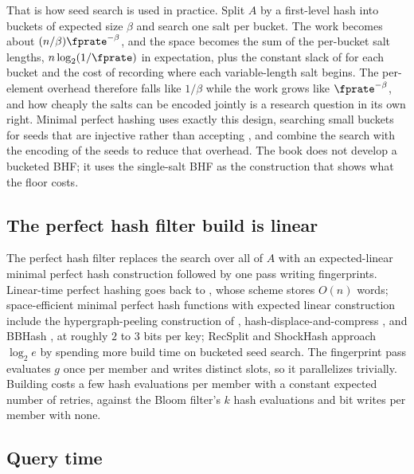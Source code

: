 That is how seed search is used in practice. Split $A$ by a first-level
hash into buckets of expected size $\beta$ and search one salt per
bucket. The work becomes about $(n/\beta) \fprate^{-\beta}$, and the
space becomes the sum of the per-bucket salt lengths, $n
\log_2(1/\fprate)$ in expectation, plus the constant slack of
 for each bucket and the cost of recording where
each variable-length salt begins. The per-element overhead therefore
falls like $1/\beta$ while the work grows like $\fprate^{-\beta}$, and
how cheaply the salts can be encoded jointly is a research question in
its own right. Minimal perfect hashing uses exactly this design,
searching small buckets for seeds that are injective rather than
accepting \parencite{esposito-graf-vigna-2020,lehmann-sanders-walzer-2024},
and \textcite{lehmann-et-al-2025} combine the search with the encoding of
the seeds to reduce that overhead. The book does not develop a bucketed
BHF; it uses the single-salt BHF as the construction that shows what the
floor costs.

\subsection*{The perfect hash filter build is linear}

The perfect hash filter replaces the search over all of $A$ with an
expected-linear minimal perfect hash construction followed by one pass
writing fingerprints. Linear-time perfect hashing goes back to
\textcite{fredman-komlos-szemeredi-1984}, whose scheme stores $O(n)$
words; space-efficient minimal perfect hash functions with expected
linear construction include the hypergraph-peeling construction of
\textcite{botelho-pagh-ziviani-2007}, hash-displace-and-compress
\parencite{belazzougui-2009}, and BBHash \parencite{limasset-et-al-2017},
at roughly $2$ to $3$ bits per key; RecSplit and ShockHash approach
$\log_2 e$ by spending more build time on bucketed seed search. The
fingerprint pass evaluates $g$ once per member and writes distinct slots,
so it parallelizes trivially. Building costs a few hash evaluations per
member with a constant expected number of retries, against the Bloom
filter's $k$ hash evaluations and bit writes per member with none.

\subsection*{Query time}

